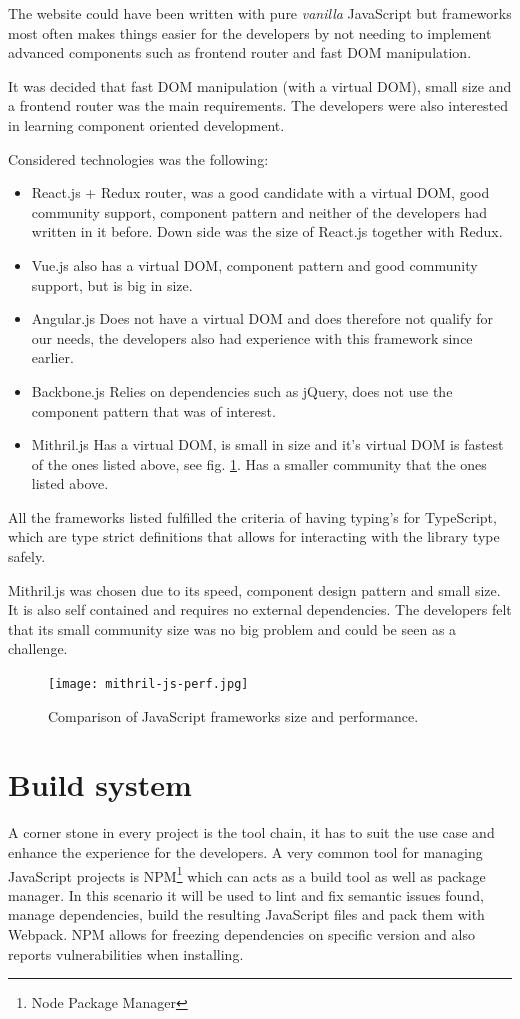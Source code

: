 \documentclass[12pt,a4paper]{report}
\begin{document}
The website could have been written with pure \textit{vanilla} JavaScript but frameworks most often makes things easier for the developers by not needing to implement advanced components such as frontend router and fast DOM manipulation.

It was decided that fast DOM manipulation (with a virtual DOM), small size and a frontend router was the main requirements. The developers were also interested in learning component oriented development.

Considered technologies was the following:
\begin{itemize}
    \item React.js + Redux router, was a good candidate with a virtual DOM, good community support, component pattern and neither of the developers had written in it before. Down side was the size of React.js together with Redux.
    \item Vue.js also has a virtual DOM, component pattern and good community support, but is big in size.
    \item Angular.js Does not have a virtual DOM and does therefore not qualify for our needs, the developers also had experience with this framework since earlier.
    \item Backbone.js Relies on dependencies such as jQuery, does not use the component pattern that was of interest.
    \item Mithril.js Has a virtual DOM, is small in size and it's virtual DOM is fastest of the ones listed above, see fig. \ref{fig:js-comp}. Has a smaller community that the ones listed above.
\end{itemize}

All the frameworks listed fulfilled the criteria of having typing's for TypeScript, which are type strict definitions that allows for interacting with the library type safely.

Mithril.js\cite{mithril-js} was chosen due to its speed, component design pattern and small size. It is also self contained and requires no external dependencies. The developers felt that its small community size was no big problem and could be seen as a challenge.

\begin{figure}[H]
  \centering
  \texttt{[image: mithril-js-perf.jpg]}
  \caption{Comparison of JavaScript frameworks size and performance\cite{mithril-speed}.}
  \label{fig:js-comp}
\end{figure}

\newpage
\section{Build system}
A corner stone in every project is the tool chain, it has to suit the use case and enhance the experience for the developers. A very common tool for managing JavaScript projects is NPM\footnote{Node Package Manager} which can acts as a build tool as well as package manager. In this scenario it will be used to lint and fix semantic issues found, manage dependencies, build the resulting JavaScript files and pack them with Webpack\cite{webpack}. NPM allows for freezing dependencies on specific version and also reports vulnerabilities when installing.
\end{document}
